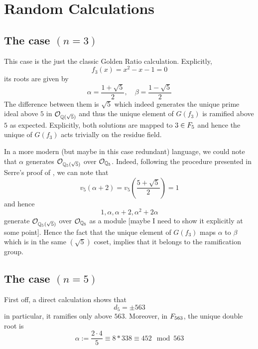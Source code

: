 \documentclass[../main.tex]{subfiles}
\begin{document}
\section{Random Calculations}
\subsection{The case $\left( n = 3 \right)$}
This case is the just the classic Golden Ratio calculation. 
Explicitly, 
\[
  f_3\left( x \right) = x^2 - x - 1 = 0
\]
its roots are given by
\[
  \alpha = \frac{ 1 + \sqrt{5} }{ 2 }, \quad 
  \beta = \frac{ 1 - \sqrt{5} }{ 2 }
\]
The difference between them is $\sqrt{5}$ which indeed generates the unique prime ideal above $5$ in $\mathcal{O}_{\mathbb{Q}(\sqrt{5})}$ and thus the unique element of $G\left( f_3 \right)$ is ramified above $5$ as expected.
Explicitly, both solutions are mapped to $3 \in F_5$ and hence the unique of $G\left( f_3 \right)$ acts trivially on the residue field.

In a more modern (but maybe in this case redundant) language, we could note that $\alpha$ generates $\mathcal{O}_{\mathbb{Q}_5(\sqrt{5})}$ over $\mathcal{O}_{\mathbb{Q}_5}$.
Indeed, following the procedure presented in Serre's proof of \cite[III \S 6 Proposition 12]{SerreLocalFields}, we can note that 
\[
  v_5\left( \alpha + 2 \right) = 
  v_5\left( \frac{ 5 + \sqrt{5} }{ 2 } \right) = 1
\]
and hence 
\[
  1, \alpha, \alpha + 2, \alpha^2 + 2\alpha
\]
generate $\mathcal{O}_{\mathbb{Q}_5(\sqrt{5})}$ over $\mathcal{O}_{\mathbb{Q}_5}$ as a module [maybe I need to show it explicitly at some point].
Hence the fact that the unique element of $G\left( f_3 \right)$ maps $\alpha$ to $\beta$ which is in the same $\left( \sqrt{5} \right)$ coset, implies that it belongs to the ramification group.

\subsection{The case $\left( n = 5 \right)$}
First off, a direct calculation shows that 
\[
  d_5 = \pm 563
\]
in particular, it ramifies only above $563$.
Moreover, in $F_{563}$, the unique double root is 
\[
  \alpha := \frac{2 \cdot 4}{5} \equiv 
  8 * 338 \equiv 452 \mod 563
\]
\end{document}
